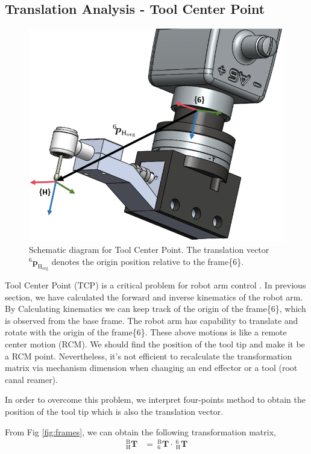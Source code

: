 \subsection{Translation Analysis - Tool Center Point}
\label{sec:tcp}
\begin{figure}[htbp]
\begin{center}
\includegraphics[width=0.7\linewidth]{Images/TCP.png}
\caption{
Schematic diagram for Tool Center Point. The translation vector $^\mathrm{6}\!\boldsymbol{p}_\mathrm{H_{org}}$ denotes the origin position relative to the frame\{6\}.
}\label{fig:tcp}
\end{center}
\end{figure}
Tool Center Point (TCP) is a critical problem for robot arm control \cite{yang2017four}. In previous section, we have calculated the forward and inverse kinematics of the robot arm. By Calculating kinematics we can keep track of the origin of the frame\{6\}, which is observed from the base frame. The robot arm has capability to translate and rotate with the origin of the frame\{6\}. These above motions is like a remote center motion (RCM). We should find the position of the tool tip and make it be a RCM point. Nevertheless, it's not efficient to recalculate the transformation matrix via mechanism dimension when changing an end effector or a tool (root canal reamer).
\par
In order to overcome this problem, we interpret four-points method to obtain the position of the tool tip which is also the translation vector.
\par\noindent
From Fig \ref{fig:frames}, we can obtain the following transformation matrix,
\begin{equation}
\begin{split}
_{\mathrm{H}}^{\mathrm{B}}\mathbf{T} &=\ _{\mathrm{6}}^{\mathrm{B}}\mathbf{T}\cdot \ _{\mathrm{H}}^{\mathrm{6}}\mathbf{T}\\
\end{split}
\end{equation}		
